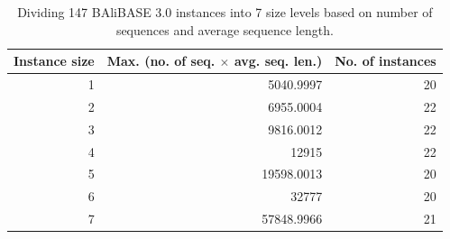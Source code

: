 \begin{table}[htbp]
	\centering
	\caption{Dividing 147 BAliBASE 3.0 instances into 7 size levels based on number of sequences and average sequence length.}
	\begin{tabular}{r|r|r}
		\multicolumn{1}{l|}{Instance size} & \multicolumn{1}{l|}{Max. (no. of seq. $\times$ avg. seq. len.)} & No. of instances\\
		\hline
		1     & 5040.9997 & 20 \\
		\hline
		2     & 6955.0004 & 22 \\
		\hline
		3     & 9816.0012 & 22 \\
		\hline
		4     & 12915 & 22 \\
		\hline
		5     & 19598.0013 & 20 \\
		\hline
		6     & 32777 & 20 \\
		\hline
		7     & 57848.9966 & 21\\
		\hline
	\end{tabular}%
	\label{tab:data-size}%
\end{table}%


